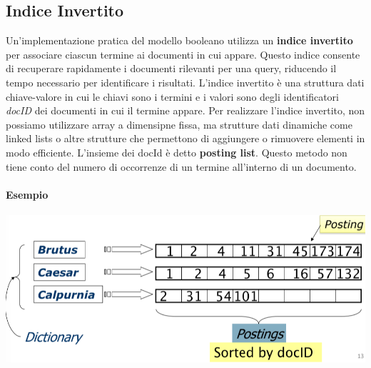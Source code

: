 \documentclass{report}
\begin{document}
	\subsection{Indice Invertito}
	Un'implementazione pratica del modello booleano utilizza un \textbf{indice invertito} per associare ciascun termine ai documenti in cui appare. Questo indice consente di recuperare rapidamente i documenti rilevanti per una query, riducendo il tempo necessario per identificare i risultati. L'indice invertito è una struttura dati chiave-valore in cui le chiavi sono i termini e i valori sono degli identificatori \textit{docID} dei documenti in cui il termine appare. Per realizzare l'indice invertito, non possiamo utilizzare array a dimensipne fissa, ma strutture dati dinamiche come linked lists o altre strutture che permettono di aggiungere o rimuovere elementi in modo efficiente. L'insieme dei docId è detto \textbf{posting list}. Questo metodo non tiene conto del numero di occorrenze di un termine all'interno di un documento.

	\paragraph{Esempio}
	\begin{center}
		\includegraphics[scale=0.5]{assets/invertedindex.png}
	\end{center}
\end{document}
